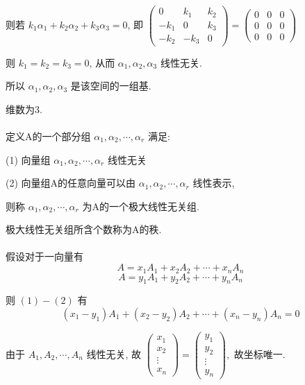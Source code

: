 	 则若 \( k_{1}\alpha_{1} + k_{2}\alpha_{2} + k_{3}\alpha_{3} = 0 \), 即 \( \begin{pmatrix} 0 & k_{1} & k_{2} \\ -k_{1} & 0 & k_{3} \\ -k_{2} & -k_{3} & 0 \end{pmatrix} = \begin{pmatrix} 0 & 0 & 0 \\ 0 & 0 & 0 \\ 0 & 0 & 0 \end{pmatrix} \)

	 则 \( k_{1} = k_{2} = k_{3} = 0 \), 从而 \( \alpha_{1}, \alpha_{2}, \alpha_{3} \) 线性无关.

	 所以 \( \alpha_{1}, \alpha_{2}, \alpha_{3} \) 是该空间的一组基.

	 维数为3.


 \paragraph{} %
	 定义A的一个部分组 \( \alpha_{1}, \alpha_{2}, \cdots, \alpha_{r} \) 满足:

	 \setlength{\parindent}{2em}
	 (1) 向量组 \( \alpha_{1}, \alpha_{2}, \cdots, \alpha_{r} \) 线性无关

	 (2) 向量组A的任意向量可以由 \( \alpha_{1}, \alpha_{2}, \cdots, \alpha_{r} \) 线性表示,

	 \setlength{\parindent}{0pt}
	 则称 \( \alpha_{1}, \alpha_{2}, \cdots, \alpha_{r} \) 为A的一个极大线性无关组.

	 极大线性无关组所含个数称为A的秩.


 \paragraph{} %
	 假设对于一向量有
	 \[ A = x_{1}A_{1} + x_{2}A_{2} + \cdots + x_{n}A_{n} \tag{1} \]
	 \[ A = y_{1}A_{1} + y_{2}A_{2} + \cdots + y_{n}A_{n} \tag{2} \]

	 则 \((1)-(2)\) 有
	 \[ (x_{1} - y_{1})A_{1} + (x_{2} - y_{2})A_{2} + \cdots + (x_{n} - y_{n})A_{n} = 0 \]

	 由于 \( A_{1}, A_{2}, \cdots, A_{n} \) 线性无关, 故
	 \( \begin{pmatrix} x_{1} \\ x_{2} \\ \vdots \\ x_{n} \end{pmatrix} = \begin{pmatrix} y_{1} \\ y_{2} \\ \vdots \\ y_{n} \end{pmatrix}, \) 故坐标唯一.


